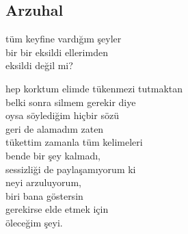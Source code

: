 \subsection{Arzuhal}

tüm keyfine vardığım şeyler \\
bir bir eksildi ellerimden \\
eksildi değil mi?

\noindent\newline
hep korktum elimde tükenmezi tutmaktan \\
belki sonra silmem gerekir diye \\
oysa söylediğim hiçbir sözü \\
geri de alamadım zaten \\
tükettim zamanla tüm kelimeleri \\
bende bir şey kalmadı, \\
sessizliği de paylaşamıyorum ki \\
neyi arzuluyorum, \\
	biri bana göstersin \\
		gerekirse elde etmek için \\
			öleceğim şeyi.